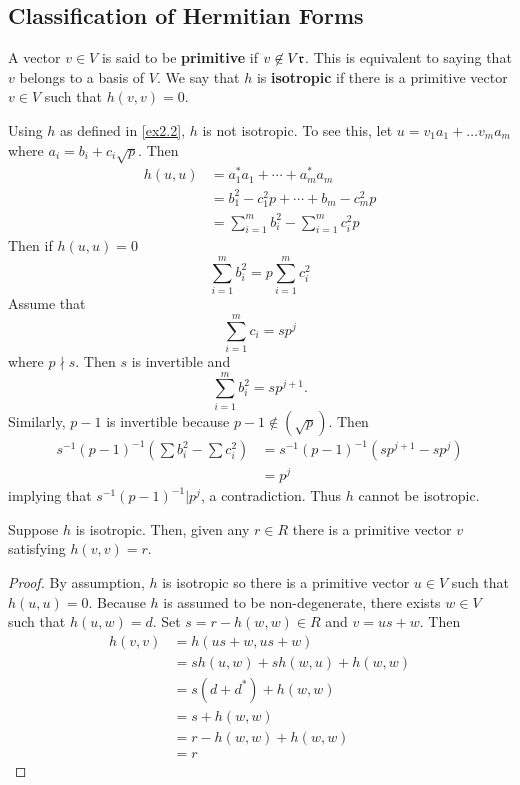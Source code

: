 \begin{center}
\section{Classification of Hermitian Forms}
\end{center}

A vector $v \in V$ is said to be \textbf{primitive} if $v \not\in V \mathfrak{r}$.
This is equivalent to saying that $v$ belongs to a basis of $V$.
We say that $h$ is \textbf{isotropic} if there is a primitive vector $v \in V$ such that $h(v,v) = 0$.

\begin{example}\label{ex3.1}
Using $h$ as defined in \cref{ex2.2}, $h$ is not isotropic.
To see this, let $u = v_1 a_1 + \dotsc v_m a_m$ where $a_i = b_i + c_i \sqrt{p}$.
Then
\begin{align*}
h(u,u) &= a_1^* a_1 + \dotsb + a_m^*a_m\\
&= b_1^2 - c_1^2 p + \dotsb + b_m - c_m^2p\\
&= \sum_{i=1}^m b_i^2 - \sum_{i=1}^m c_i^2 p
\end{align*}
Then if $h(u,u) = 0$
\[
\sum_{i=1}^m b_i^2 = p \sum_{i=1}^m c_i^2
\]
Assume that
\[
\sum_{i=1}^m c_i = s p^j
\]
where $p \nmid s$.
Then $s$ is invertible and 
\[
\sum_{i=1}^m b_i^2 = sp^{j+1}.
\]
Similarly, $p-1$ is invertible because $p-1 \not\in (\sqrt{p})$.
Then
\begin{align*}
s^{-1}(p-1)^{-1}\left(\sum b_i^2 - \sum c_i^2 \right) &= s^{-1}(p-1)^{-1}(sp^{j+1} - sp^j)\\
&= p^j
\end{align*}
implying that $s^{-1}(p-1)^{-1} | p^j$, a contradiction.
Thus $h$ cannot be isotropic.
\end{example}

\begin{lemma}\label{lemma3.1}
Suppose $h$ is isotropic. Then, given any $r \in R$ there is a primitive vector $v$ satisfying $h(v,v) = r$.
\end{lemma}

\begin{proof}
By assumption, $h$ is isotropic so there is a primitive vector $u \in V$ such that $h(u,u) = 0$.
Because $h$ is assumed to be non-degenerate, there exists $w \in V$ such that $h(u,w) = d$.
Set $s = r - h(w,w) \in R$ and $v = us + w$.
Then
\begin{align*}
h(v,v) &= h(us + w, us + w) \\
&= sh(u,w) + sh(w,u) + h(w,w) \\
&= s(d + d^*) + h(w,w) \\
&= s + h(w,w)\\
&= r - h(w,w) + h(w,w)\\
&= r
\end{align*}
\end{proof}


